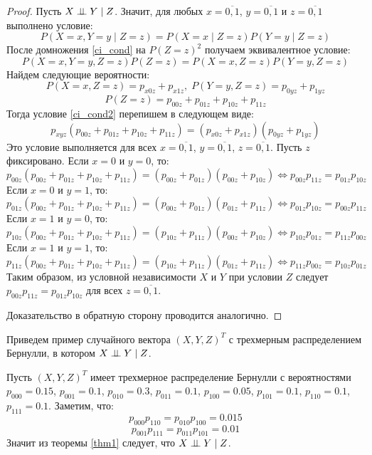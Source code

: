\begin{proof}
    Пусть $X \perp\!\!\!\perp Y \mid Z$. Значит, для любых $x=\overline{0,1}$, $y=\overline{0,1}$ и $z=\overline{0,1}$ выполнено условие:
    \begin{equation}\label{ci_cond}
        P(X=x, Y=y \mid Z = z) = P(X=x \mid Z = z) P(Y=y \mid Z = z)
    \end{equation}
    После домножения \eqref{ci_cond} на $P(Z=z)^2$ получаем эквивалентное условие:
    \begin{equation}\label{ci_cond2}
        P(X=x,Y=y,Z=z)P(Z=z)=P(X=x,Z=z)P(Y=y,Z=z)
    \end{equation}
    Найдем следующие вероятности:
    $$
        P(X=x, Z=z) = p_{x0z} + p_{x1z},\;  P(Y=y, Z=z) = p_{0yz} + p_{1yz}
    $$
    $$
        P(Z=z)= p_{00z} + p_{01z} + p_{10z} + p_{11z}
    $$
    Тогда условие \eqref{ci_cond2} перепишем в следующем виде:
    $$
        p_{xyz} (p_{00z} + p_{01z} + p_{10z} + p_{11z}) = (p_{x0z} + p_{x1z}) (p_{0yz} + p_{1yz})
    $$
    Это условие выполняется для всех $x=\overline{0,1}$, $y=\overline{0,1}$, $z=\overline{0,1}$.
    Пусть $z$ фиксировано.
    Если $x=0$ и $y=0$, то:
    $$
        p_{00z} (p_{00z} + p_{01z} + p_{10z} + p_{11z}) = (p_{00z} + p_{01z}) (p_{00z} + p_{10z})
    \Leftrightarrow
        p_{00z} p_{11z} = p_{01z} p_{10z}
    $$
    Если $x=0$ и $y=1$, то:
    $$
        p_{01z} (p_{00z} + p_{01z} + p_{10z} + p_{11z}) = (p_{00z} + p_{01z}) (p_{01z} + p_{11z})
    \Leftrightarrow
        p_{01z}p_{10z}=p_{00z} p_{11z}
    $$
    Если $x=1$ и $y=0$, то:
    $$
        p_{10z} (p_{00z} + p_{01z} + p_{10z} + p_{11z}) = (p_{10z} + p_{11z}) (p_{00z} + p_{10z})
    \Leftrightarrow
        p_{10z} p_{01z} = p_{11z}p_{00z}
    $$
    Если $x=1$ и $y=1$, то:
    $$
        p_{11z} (p_{00z} + p_{01z} + p_{10z} + p_{11z}) = (p_{10z} + p_{11z}) (p_{01z} + p_{11z})
    \Leftrightarrow
        p_{11z} p_{00z} = p_{10z} p_{01z}
    $$
    Таким образом, из условной независимости $X$ и $Y$ при условии $Z$ следует
    $p_{00z}p_{11z}=p_{01z}p_{10z}$ для всех $z=\overline{0,1}$.

    Доказательство в обратную сторону проводится аналогично.
\end{proof}
Приведем пример случайного вектора $(X,Y,Z)^T$ с трехмерным распределением Бернулли, в котором $X \perp\!\!\!\perp Y \mid Z$.
\begin{example}
    Пусть $(X,Y,Z)^T$ имеет трехмерное распределение Бернулли с вероятностями
    $p_{000}=0.15$, $p_{001}=0.1$, $p_{010}=0.3$, $p_{011}=0.1$, $p_{100}=0.05$, $p_{101}=0.1$,
    $p_{110}=0.1$, $p_{111}=0.1$.
    Заметим, что:
    $$p_{000}p_{110}=p_{010}p_{100}=0.015$$ $$p_{001}p_{111}=p_{011}p_{101}=0.01$$
    Значит из теоремы \ref{thm1} следует, что $X \perp\!\!\!\perp Y \mid Z$.
\end{example}

